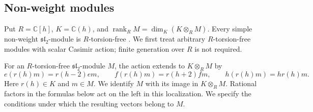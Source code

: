 \documentclass[11pt,reqno]{amsart}
\numberwithin{equation}{section}
\newcommand{\C}{\mathbb C}
\newcommand{\s}{\mathfrak{sl}_2}
\DeclareMathOperator{\rank}{rank}
\theoremstyle{definition}
\theoremstyle{remark}
\begin{document}
\subsection{Non-weight modules}\label{subsec:non-weight}

Put \(R=\C[h]\), \(K=\C(h)\), and
\(\rank_R M=\dim_K(K\otimes_R M)\).
Every simple non-weight \(\s\)-module is \(R\)-torsion-free
\cite[Theorem~6.1.3]{Maz10}. We first treat arbitrary
\(R\)-torsion-free modules with scalar Casimir action; finite
generation over \(R\) is not required.

For an \(R\)-torsion-free \(\s\)-module \(M\), the action extends
to \(K\otimes_R M\) by
\begin{equation}\label{eq:localized-action}
e(r(h)m)=r(h-2)em,\qquad
f(r(h)m)=r(h+2)fm,\qquad h(r(h)m)=hr(h)m.
\end{equation}
Here \(r(h)\in K\) and \(m\in M\).
We identify \(M\) with its image in \(K\otimes_R M\).
Rational factors in the formulas below act on the left in this
localization. We specify the conditions under which the resulting
vectors belong to \(M\).
\end{document}
